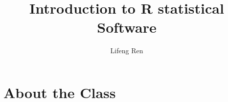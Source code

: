 \documentclass[xcolor=x11names,compress]{beamer}
\begin{document}

\title{Introduction to R statistical Software} 

\author[Lifeng Ren]{Lifeng Ren} 

{%
  \begin{frame}
    \titlepage
  \end{frame}
}

\section{About the Class}

\end{document}
